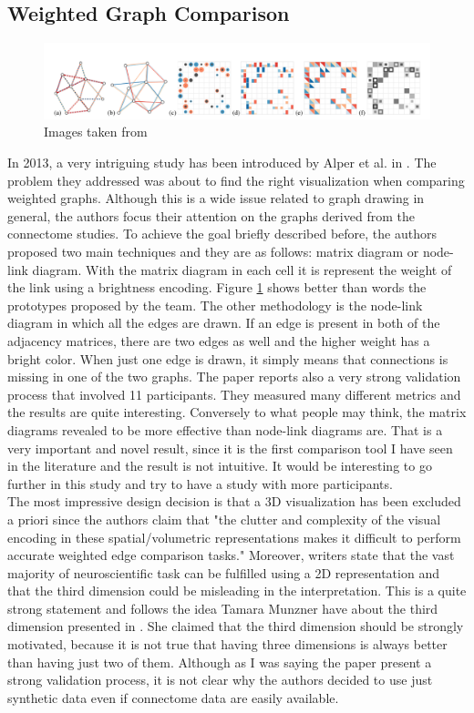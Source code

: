 \documentclass{article}
\begin{document}
\begin{multicols}{2}
\subsection{Weighted Graph Comparison}
\begin{figure}[ht]
\centering
\includegraphics[width = 1.8\columnwidth]{weightedGraphs}
\caption{Images taken from \cite{weightedGraphComparison}}
\label{fig:weightedGraph}
\end{figure}
In 2013, a very intriguing study has been introduced by Alper et al. in \cite{weightedGraphComparison}. The problem they addressed was about to find the right visualization when comparing weighted graphs. Although this is a wide issue related to graph drawing in general, the authors focus their attention on the graphs derived from the connectome studies. To achieve the goal briefly described before, the authors proposed two main techniques and they are as follows: matrix diagram or node-link diagram. With the matrix diagram in each cell it is represent the weight of the link using a brightness encoding. Figure \ref{fig:weightedGraph} shows better than words the prototypes proposed by the team. The other methodology is the node-link diagram in which all the edges are drawn. If an edge is present in both of the adjacency matrices, there are two edges as well and the higher weight has a bright color. When just one edge is drawn, it simply means that connections is missing in one of the two graphs.
The paper reports also a very strong validation process that involved 11 participants. They measured many different metrics and the results are quite interesting. Conversely to what people may think, the matrix diagrams revealed to be more effective than node-link diagrams are. That is a very important and novel result, since it is the first comparison tool I have seen in the literature and the result is not intuitive. It would be interesting to go further in this study and try to have a study with more participants.\\
The most impressive design decision is that a 3D visualization has been excluded a priori since the authors claim that "the clutter and complexity of the visual encoding in these spatial/volumetric representations makes it difficult to perform accurate weighted edge comparison tasks." Moreover, writers state that the vast majority of neuroscientific task can be fulfilled using a 2D representation and that the third dimension could be misleading in the interpretation. This is a quite strong statement and follows the idea Tamara Munzner have about the third dimension presented in \cite{processAndPitfalls}. She claimed that the third dimension should be strongly motivated, because it is not true that having three dimensions is always better than having just two of them. Although as I was saying the paper present a  strong validation process, it is not clear why the authors decided to use just synthetic data even if connectome data are easily available.



\end{multicols}
\end{document}

